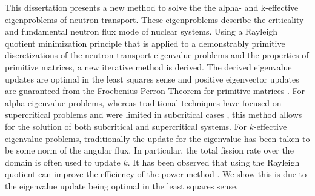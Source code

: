 This dissertation presents a new method to solve the the alpha- and k-effective eigenproblems of neutron transport. These eigenproblems describe the criticality and fundamental neutron flux mode of nuclear systems. Using a Rayleigh quotient minimization principle that is applied to a demonstrably primitive discretizations of the neutron transport eigenvalue problems and the properties of primitive matrices, a new iterative method is derived. The derived eigenvalue updates are optimal in the least squares sense and positive eigenvector updates are guaranteed from the Froebenius-Perron Theorem for primitive matrices \cite{birkhoff_reactor_1958}. For alpha-eigenvalue problems, whereas traditional techniques have focused on supercritical problems and were limited in subcritical cases \cite{hill_efficient_1983}, this method allows for the solution of both subcritical and supercritical systems. For $k$-effective eigenvalue problems, traditionally the update for the eigenvalue has been taken to be some norm of the angular flux. In particular, the total fission rate over the domain is often used to update $k$. It has been observed that using the Rayleigh quotient can improve the efficiency of the power method \cite{warsa2004krylov}. We show this is due to the eigenvalue update being optimal in the least squares sense. 
